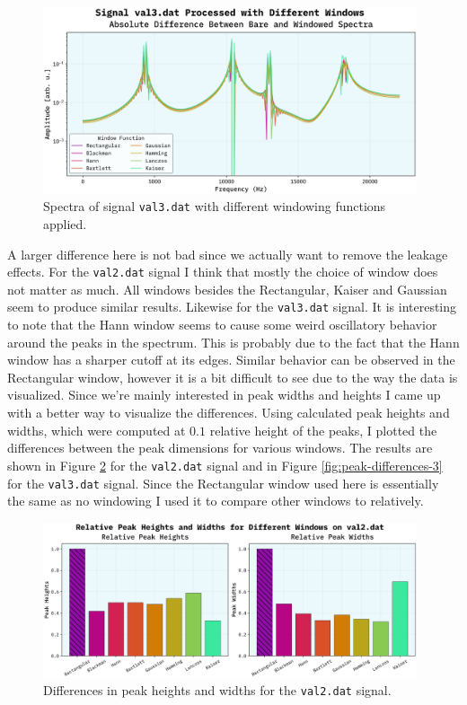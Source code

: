 \documentclass[10pt, titlepage, a4paper]{article}
\begin{document}
\begin{figure}[H]
    \centering
    \includegraphics[width=0.98\textwidth]{../SpectralAnalysis/Images/window-spectra-val3.dat.png}
    \caption{Spectra of signal \texttt{val3.dat} with different windowing functions applied.}
    \label{fig:windowing-val3}
\end{figure}

A larger difference here is not bad since we actually want to remove the leakage effects. For the \texttt{val2.dat} signal
I think that mostly the choice of window does not matter as much. All windows besides the Rectangular, Kaiser and Gaussian seem 
to produce similar results. Likewise for the \texttt{val3.dat} signal. It is interesting to note that the Hann window seems to 
cause some weird oscillatory behavior around the peaks in the spectrum. This is probably due to the fact that the Hann window has 
a sharper cutoff at its edges. Similar behavior can be observed in the Rectangular window, however it is a bit difficult to see 
due to the way the data is visualized. Since we're mainly interested in peak widths and heights I came up with a better way to 
visualize the differences. Using calculated peak heights and widths, which were computed at $0.1$ relative height of the peaks,
I plotted the differences between the peak dimensions for various windows. The results are shown in Figure \ref{fig:peak-differences-2} 
for the \texttt{val2.dat} signal and in Figure \ref{fig:peak-differences-3} for the \texttt{val3.dat} signal. Since the Rectangular
window used here is essentially the same as no windowing I used it to compare other windows to relatively.

\begin{figure}[H]
    \centering
    \includegraphics[width=0.98\textwidth]{../SpectralAnalysis/Images/peak-widths-val2.dat.png}
    \caption{Differences in peak heights and widths for the \texttt{val2.dat} signal.}
    \label{fig:peak-differences-2}
\end{figure}
\end{document}

